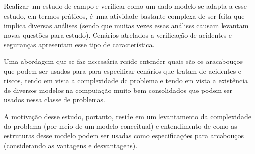 Realizar um estudo de campo e verificar como um dado modelo se adapta a esse estudo, em termos práticos, é uma atividade bastante complexa de ser feita que implica diversas análises (sendo que muitas vezes essas análises causam levantam novas questões para estudo). Cenários atrelados a verificação de acidentes e seguranças apresentam esse tipo de característica. 

Uma abordagem que se faz necessária reside entender quais são os aracabouços que podem ser usados para para especificar cenários que tratam de acidentes e riscos, tendo em vista a complexidade do problema e tendo em vista a existência de diversos modelos na computação muito bem consolidados que podem ser usados nessa classe de problemas. 

A motivação desse estudo, portanto, reside em um levantamento da complexidade do problema (por meio de um modelo conceitual) e entendimento de como as estruturas desse modelo podem ser usadas como especificações para arcabouços (considerando as vantagens e desvantagens).
